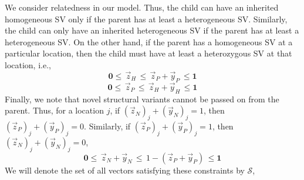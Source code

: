 \documentclass{article}
\def\R{\mathbb{R}} %
\newcommand{\zP}{\vec{z}_P }
\newcommand{\zH}{\vec{z}_H }
\newcommand{\zN}{\vec{z}_N }
\newcommand{\yP}{\vec{y}_P }
\newcommand{\yH}{\vec{y}_H }
\newcommand{\yN}{\vec{y}_N }
\begin{document}
We consider relatedness in our model. Thus, the child can have an inherited homogeneous SV only if the parent has at least a heterogeneous SV. Similarly, the child can only have an inherited heterogeneous SV if the parent has at least a heterogeneous SV. On the other hand, if the parent has a homogeneous SV at a particular location, then the child must have at least a heterozygous SV at that location, i.e.,
\begin{equation*}
	\mathbf{0} \leq \, \zH   \, \leq \, \zP + \yP  \, \leq \mathbf{1}
\end{equation*}
\begin{equation*}
	\mathbf{0} \leq \, \zP   \, \leq \, \zH + \yH  \, \leq \mathbf{1}
\end{equation*}
Finally, we note that novel structural variants cannot be passed on from the parent. Thus, for a location $j$, if $(\zN)_j + (\yN)_j =1$, then  $(\zP)_j + (\yP)_j =0$. Similarly, if $(\zP)_j + (\yP)_j  =1$, then  $(\zN)_j + (\yN)_j =0$,
\begin{equation*}
	\mathbf{0} \leq \, \zN + \yN   \, \leq \, 1- (\zP +\yP)  \, \leq \mathbf{1}
\end{equation*}
We will denote the set of all vectors satisfying these constraints by $\mathcal{S}$,
\renewcommand{\arraystretch}{1.3}
\end{document}
